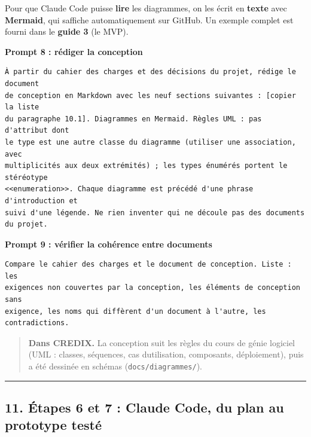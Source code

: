 \documentclass[
  french,
  11pt,
  a4paper,
]{article}
\begin{document}
Pour que Claude Code puisse \textbf{lire} les diagrammes, on les écrit
en \textbf{texte} avec \textbf{Mermaid}, qui s\textquotesingle affiche
automatiquement sur GitHub. Un exemple complet est fourni dans le
\textbf{guide 3} (le MVP).

\textbf{Prompt 8 : rédiger la conception}

\begin{Verbatim}[breaklines=true,breakanywhere=true,fontsize=\small,frame=leftline,framerule=1.6pt,rulecolor=\color{credixblue},framesep=3mm,xleftmargin=2mm,xrightmargin=1mm]
À partir du cahier des charges et des décisions du projet, rédige le document
de conception en Markdown avec les neuf sections suivantes : [copier la liste
du paragraphe 10.1]. Diagrammes en Mermaid. Règles UML : pas d'attribut dont
le type est une autre classe du diagramme (utiliser une association, avec
multiplicités aux deux extrémités) ; les types énumérés portent le stéréotype
<<enumeration>>. Chaque diagramme est précédé d'une phrase d'introduction et
suivi d'une légende. Ne rien inventer qui ne découle pas des documents du projet.
\end{Verbatim}

\textbf{Prompt 9 : vérifier la cohérence entre documents}

\begin{Verbatim}[breaklines=true,breakanywhere=true,fontsize=\small,frame=leftline,framerule=1.6pt,rulecolor=\color{credixblue},framesep=3mm,xleftmargin=2mm,xrightmargin=1mm]
Compare le cahier des charges et le document de conception. Liste : les
exigences non couvertes par la conception, les éléments de conception sans
exigence, les noms qui diffèrent d'un document à l'autre, les contradictions.
\end{Verbatim}

\begin{quote}
\textbf{Dans CREDIX.} La conception suit les règles du cours de génie
logiciel (UML : classes, séquences, cas d\textquotesingle utilisation,
composants, déploiement), puis a été dessinée en schémas
(\texttt{docs/\allowbreak{}diagrammes/\allowbreak{}}).
\end{quote}

\begin{center}\rule{0.5\linewidth}{0.5pt}\end{center}

\subsection{11. Étapes 6 et 7 : Claude Code, du plan au prototype
testé}\label{11-uxe9tapes-6-et-7--claude-code-du-plan-au-prototype-testuxe9}
\end{document}
